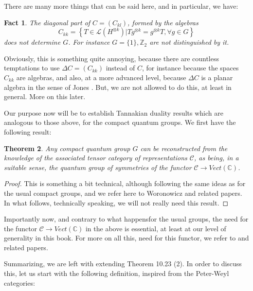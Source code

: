\documentclass[12pt]{amsbook}
\newtheorem{theorem}{Theorem}[chapter]
\newtheorem{fact}[theorem]{Fact}
\begin{document}
There are many more things that can be said here, and in particular, we have:


\begin{fact}
The diagonal part of $C=(C_{kl})$, formed by the algebras
$$C_{kk}=\left\{T\in\mathcal L(H^{\otimes k})\Big|Tg^{\otimes k}=g^{\otimes k}T,\forall g\in G\right\}$$
does not determine $G$. For instance $G=\{1\},\mathbb Z_2$ are not distinguished by it.
\end{fact}

Obviously, this is something quite annoying, because there are countless temptations to use $\Delta C=(C_{kk})$ instead of $C$, for instance because the spaces $C_{kk}$ are algebras, and also, at a more advanced level, because $\Delta C$ is a planar algebra in the sense of Jones \cite{jo3}. But, we are not allowed to do this, at least in general. More on this later.

\bigskip

Our purpose now will be to establish Tannakian duality results which are analogous to those above, for the compact quantum groups. We first have the following result:

\begin{theorem}
Any compact quantum group $G$ can be reconstructed from the knowledge of the associated tensor category of representations $\mathcal C$, as being, in a suitable sense, the quantum group of symmetries of the functor $\mathcal C\to Vect(\mathbb C)$.
\end{theorem}

\begin{proof}
This is something a bit technical, although following the same ideas as for the usual compact groups, and we refer here to Woronowicz \cite{wo2} and related papers. In what follows, technically speaking, we will not really need this result.
\end{proof}

Importantly now, and contrary to what happensfor the usual groups, the need for the functor $\mathcal C\to Vect(\mathbb C)$ in the above is essential, at least at our level of generality in this book. For more on all this, need for this functor, we refer to \cite{egn} and related papers.

\bigskip

Summarizing, we are left with extending Theorem 10.23 (2). In order to discuss this, let us start with the following definition, inspired from the Peter-Weyl categories:
\end{document}
